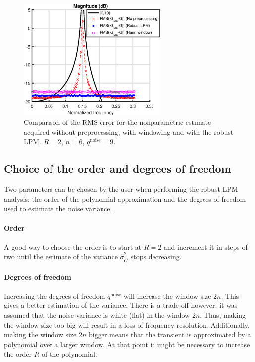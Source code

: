 \begin{figure}[H]
    \centering
    \includegraphics[width = 0.65\textwidth]{figures/LPM_example.eps}
    \caption{Comparison of the RMS error for the nonparametric estimate acquired without preprocessing, with windowing and with the robust LPM. $R=2$, $n = 6$, $q^{\text{noise}} = 9$.}
    \label{fig:LPM_example}
\end{figure}

\subsection{Choice of the order and degrees of freedom}
\label{sec:choice_order_dof}
Two parameters can be chosen by the user when performing the robust LPM analysis: the order of the polynomial approximation and the degrees of freedom used to estimate the noise variance.

\paragraph{Order}
A good way to choose the order is to start at $R=2$ and increment it in steps of two until the estimate of the variance $\hat \sigma^2_{\hat G}$ stops decreasing.

\paragraph{Degrees of freedom}
Increasing the degrees of freedom $q^{\text{noise}}$ will increase the window size $2n$. This gives a better estimation of the variance. There is a trade-off however: it was assumed that the noise variance is white (flat) in the window $2n$. Thus, making the window size too big will result in a loss of frequency resolution. Additionally, making the window size $2n$ bigger means that the transient is approximated by a polynomial over a larger window. At that point it might be necessary to increase the order $R$ of the polynomial.

